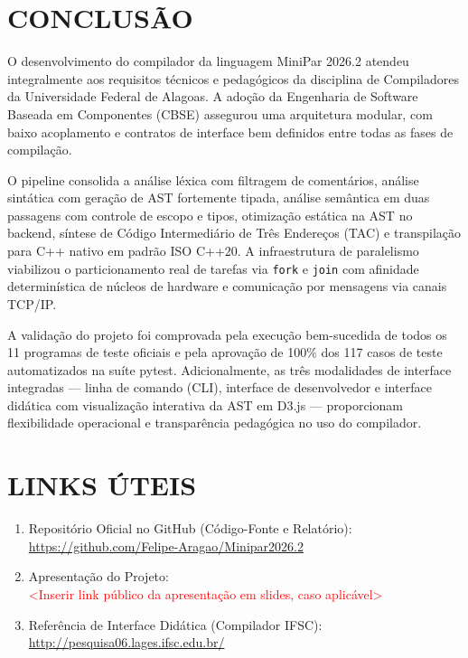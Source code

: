\chapter{CONCLUSÃO}

O desenvolvimento do compilador da linguagem MiniPar 2026.2 atendeu integralmente aos requisitos técnicos e pedagógicos da disciplina de Compiladores da Universidade Federal de Alagoas. A adoção da Engenharia de Software Baseada em Componentes (CBSE) assegurou uma arquitetura modular, com baixo acoplamento e contratos de interface bem definidos entre todas as fases de compilação.

O pipeline consolida a análise léxica com filtragem de comentários, análise sintática com geração de AST fortemente tipada, análise semântica em duas passagens com controle de escopo e tipos, otimização estática na AST no backend, síntese de Código Intermediário de Três Endereços (TAC) e transpilação para C++ nativo em padrão ISO C++20. A infraestrutura de paralelismo viabilizou o particionamento real de tarefas via \texttt{fork} e \texttt{join} com afinidade determinística de núcleos de hardware e comunicação por mensagens via canais TCP/IP.

A validação do projeto foi comprovada pela execução bem-sucedida de todos os 11 programas de teste oficiais e pela aprovação de 100\% dos 117 casos de teste automatizados na suíte pytest. Adicionalmente, as três modalidades de interface integradas — linha de comando (CLI), interface de desenvolvedor e interface didática com visualização interativa da AST em D3.js — proporcionam flexibilidade operacional e transparência pedagógica no uso do compilador.


\postextual

\chapter*{LINKS ÚTEIS}

\begin{enumerate}
    \item Repositório Oficial no GitHub (Código-Fonte e Relatório):\\
    \url{https://github.com/Felipe-Aragao/Minipar2026.2}
    
    \item Apresentação do Projeto:\\
    \textcolor{red}{<Inserir link público da apresentação em slides, caso aplicável>}
    
    \item Referência de Interface Didática (Compilador IFSC):\\
    \url{http://pesquisa06.lages.ifsc.edu.br/}
\end{enumerate}

